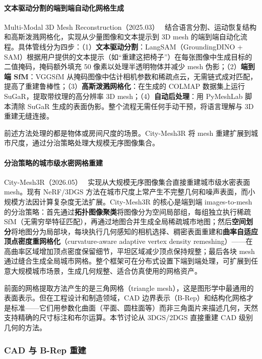 \paragraph{文本驱动分割的端到端自动化网格生成}

Multi-Modal 3D Mesh Reconstruction（2025.03）~\cite{2503_07190} 结合语言分割、运动恢复结构和高斯泼溅网格化，实现从少量图像和文本提示到 3D mesh 的端到端自动化流程。具体管线分为四步：（1）\textbf{文本驱动分割}：LangSAM（GroundingDINO + SAM）根据用户提供的文本提示（如“重建这把椅子”）在每张图像中生成目标的二值掩码，掩码额外填充 50 像素以处理半透明物体并减少 mesh 伪影；（2）\textbf{端到端 SfM}：VGGSfM 从掩码图像中估计相机参数和稀疏点云，无需链式成对匹配，提高了重建鲁棒性；（3）\textbf{高斯泼溅网格化}：在生成的 COLMAP 数据集上运行 SuGaR，提取带纹理的高分辨率 3D mesh；（4）\textbf{自动后处理}：用 PyMeshLab 脚本清除 SuGaR 生成的表面伪影。整个流程无需任何手动干预，将语言理解与 3D 重建无缝连接。

前述方法处理的都是物体或房间尺度的场景。City-Mesh3R 将 mesh 重建扩展到城市尺度，通过分治策略处理大规模无序图像集合。

\paragraph{分治策略的城市级水密网格重建}

City-Mesh3R（2026.05）~\cite{2605_30310} 实现从大规模无序图像集合直接重建城市级水密表面 mesh。现有 NeRF/3DGS 方法在城市尺度上常产生不完整几何和噪声表面，而小规模方法因计算复杂度无法扩展。City-Mesh3R 的核心是端到端 images-to-mesh 的分治策略：首先通过\textbf{拓扑图像聚类}将图像分为空间局部组，每组独立执行稀疏 SfM（无需穷举特征匹配），再通过地图合并生成全局稀疏城市地图；然后\textbf{空间划分}将地图分为局部块，每块执行几何感知的相机选择、稠密表面重建和\textbf{曲率自适应顶点密度重网格化}（curvature-aware adaptive vertex density remeshing）——在高曲率区域增加顶点密度保留细节，平坦区域减少顶点保持规整；最后各块 mesh 通过缝合生成全局城市网格。整个框架可在分布式设置下端到端处理，可扩展到任意大规模城市场景，生成几何规整、适合仿真使用的网格资产。

前面的网格提取方法产生的是三角网格（triangle mesh），这是图形学中最通用的表面表示。但在工程设计和制造领域，CAD 边界表示（B-Rep）和结构化网格才是标准——它们用参数化曲面（平面、圆柱面等）而非三角面片来描述几何，天然支持精确的尺寸标注和布尔运算。本节讨论从 3DGS/2DGS 直接重建 CAD 级别几何的方法。

\subsubsection{CAD 与 B-Rep 重建}
\label{subsec:04_4_6}

